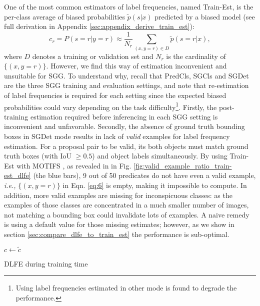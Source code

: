 \documentclass[sigconf]{acmart}
\begin{document}
One of the most common estimators of label frequencies, named Train-Est, is the per-class average of biased probabilities $\tilde{p}(s|x)$ predicted by a biased model \cite{elkan2008learning} (see full derivation in Appendix \ref{sec:appendix_derive_train_est}):
\begin{equation}
    c_r = P(s=r|y=r) \approx \frac{1}{N_r}\sum_{(x, y=r) \in D} \tilde{p}(s=r|x), \label{eq:6}
\end{equation}
where $D$ denotes a training or validation set and $N_r$ is the cardinality of $\{(x, y=r)\}$.
However, we find this way of estimation inconvenient and unsuitable for SGG.
To understand why, recall that PredCls, SGCls and SGDet are the three SGG training and evaluation settings, and note that re-estimation of label frequencies is required for each setting since the expected biased probabilities could vary depending on the task difficulty\footnote{Using label frequencies estimated in other mode is found to degrade the performance.}.
Firstly, the post-training estimation required before inferencing in each SGG setting is inconvenient and unfavorable.
Secondly, the absence of ground truth bounding boxes in SGDet mode results in lack of \textit{valid} examples for label frequency estimation.
For a proposal pair to be valid, its both objects must match ground truth boxes (with IoU $\geq 0.5$) and object labels simultaneously.
By using Train-Est with MOTIFS \cite{zellers2018neural}, as revealed in in Fig. \ref{fig:valid_example_ratio_train-est_dlfe} (the blue bars), 9 out of 50 predicates do not have even a valid example, \emph{i.e.,} $\{(x, y=r)\}$ in Eqn. \ref{eq:6} is empty, making it impossible to compute.
In addition, more valid examples are missing for inconspicuous classes: as the examples of those classes are concentrated in a much smaller number of images, not matching a bounding box could invalidate lots of examples.
A naive remedy is using a default value for those missing estimates; however, as we show in section \ref{sec:compare_dlfe_to_train_est} the performance is sub-optimal.

\begin{algorithm}[t]
\SetAlgoLined
{}
 
$c \leftarrow \tilde{c}$\; 
 \caption{DLFE during training time}
 \label{alg:dlfe_train}
\end{algorithm}
\end{document}
